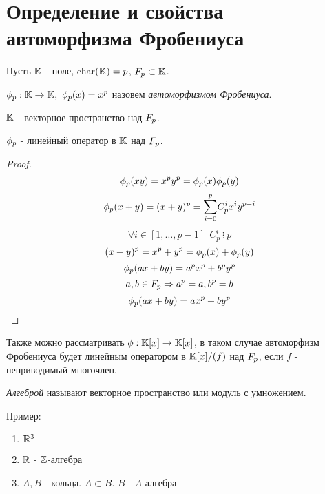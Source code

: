 \section{Определение и свойства автоморфизма Фробениуса}

Пусть $ \mathbb{K} $ - поле, char$(\mathbb{K}) = p $,  $ F_{p} \subset \mathbb{K} $.

\begin{defn}
  $ \phi_{p} : \mathbb{K} \rightarrow \mathbb{K}, ~ \phi_{p}(x) = x^p $ назовем \emph{автоморфизмом Фробениуса}. 
\end{defn}

$ \mathbb{K} $ - векторное пространство над $ F_{p} $.

\begin{thm}
  $ \phi_{p} $ - линейный оператор в $ \mathbb{K} $ над $ F_{p} $.
\end{thm}

\begin{proof}
     \[ \phi_{p}(xy) = x^py^p = \phi_{p}(x)\phi_{p}(y) \]
     \[ \phi_{p}(x + y) = (x + y)^p = \underset{i = 0}{\overset{p}\sum}C_{p}^{i}x^{i}y^{p-i} \] 
     \[ \forall i \in [1,\dots,p-1] ~~  C_{p}^{i} ~ \vdots ~ p \]  
     \[ (x+y)^p = x^p + y^p = \phi_{p}(x) + \phi_{p}(y) \] \newline
     \[ \phi_{p}(ax + by) = a^px^p + b^py^p \]
     \[ a, b \in F_{p} \Rightarrow a^p = a, b^p = b \]
     \[ \phi_{p}(ax + by) = ax^p + by^p \]
\end{proof}

Также можно рассматривать $ \phi : \mathbb{K}[x] \rightarrow \mathbb{K}[x] $, в таком случае автоморфизм Фробениуса 
будет линейным оператором в $ \mathbb{K}[x]/(f) $ над $ F_{p} $, если $ f $ - неприводимый многочлен. 

\begin{defn}
  \emph{Алгеброй} называют векторное пространство или модуль с умножением.
\end{defn}

Пример:

\begin{enumerate}
  \item $ \mathbb{R}^3 $
  \item $ \mathbb{R} $ - $\mathbb{Z}$-алгебра
  \item $ A, B $ - кольца. $ A \subset B $. $ B $ - $A$-алгебра
\end{enumerate}

